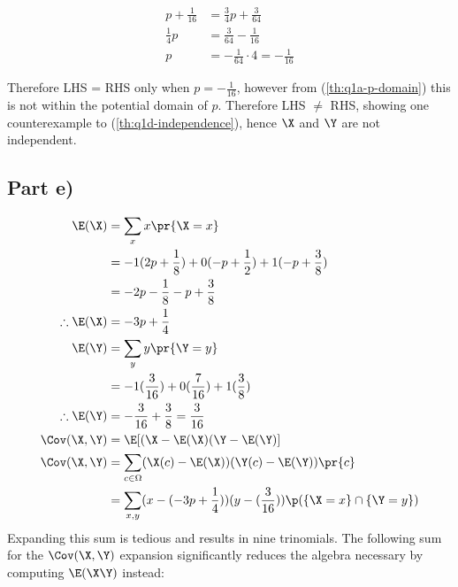 \begin{align*}
p + \frac{1}{16} &= \frac{3}{4}p + \frac{3}{64} \\
\frac{1}{4}p &= \frac{3}{64} - \frac{1}{16} \\
p &= -\frac{1}{64} \cdot 4 = -\frac{1}{16}
\end{align*}

Therefore LHS = RHS only when $p = -\frac{1}{16}$, however from (\ref{th:q1a-p-domain}) this is not within the potential domain of $p$.
Therefore LHS $\neq$ RHS, showing one counterexample to (\ref{th:q1d-independence}), hence $\X$ and $\Y$ are not independent.

\subsection{Part e)}

\begin{align*}
\E(\X) &= \sum _x x\pr{\X = x} \\
&= -1(2p + \frac{1}{8}) + 0(-p + \frac{1}{2}) + 1(-p + \frac{3}{8}) \\
&= -2p - \frac{1}{8} - p + \frac{3}{8} \\
\therefore \E(\X)&= -3p + \frac{1}{4} \\
\E(\Y) &= \sum _y y \pr{\Y = y} \\
&= -1(\frac{3}{16}) + 0(\frac{7}{16}) + 1(\frac{3}{8}) \\
\therefore \E(\Y) &= -\frac{3}{16} + \frac{3}{8} = \frac{3}{16} \\
\Cov(\X, \Y) &= \E [(\X - \E(\X)(\Y - \E(\Y)] \\
\Cov(\X, \Y) &= \sum _{c \in \Omega} (\X(c) - \E(\X))(\Y(c) - \E(\Y))\pr{c} \\
&= \sum _{x,y} (x - (-3p + \frac{1}{4}))(y - (\frac{3}{16}))\p(\{ \X = x \} \cap \{ \Y = y \}) \\
\end{align*}
Expanding this sum is tedious and results in nine trinomials.
The following sum for the $\Cov(\X, \Y)$ expansion significantly reduces the algebra necessary by computing $\E(\X \Y)$ instead:

